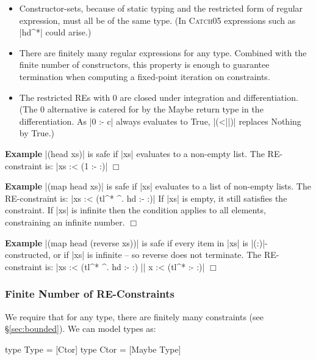 \documentclass[preprint]{sigplanconf}
\newcommand{\C}[1]{\textsf{#1}}
\newcommand{\catch}{\textsc{Catch}}
\newcounter{exmp}
\newcommand{\yesexample}{\addtocounter{exmp}{1}\addvspace{2mm}\noindent\textbf{Example \arabic{exmp}}}
\newcommand{\noexample}{\hfill$\Box$\par\addvspace{2mm}}
\newenvironment{discuss}
    {\noindent\hspace{-1.5mm}\vline\hspace{1mm}\vline\hspace{1mm}\begin{minipage}[h]{\linewidth}}
    {\end{minipage}}
\newenvironment{example}{\yesexample}{\noexample}
\begin{document}
\begin{itemize}
\item \begin{discuss} Constructor-sets, because of static typing and the restricted form of regular expression, must all be of the same type. (In \catch05 expressions such as |hd^*| could arise.)\end{discuss}

\item There are finitely many regular expressions for any type. Combined with the finite number of constructors, this property is enough to guarantee termination when computing a fixed-point iteration on constraints.

\item The restricted REs with 0 are closed under integration and differentiation. (The 0 alternative is catered for by the \C{Maybe} return type in the differentiation. As |0 :- c| always evaluates to True, |(<||)| replaces \C{Nothing} by True.)
\end{itemize}

\begin{example}
|(head xs)| is safe if |xs| evaluates to a non-empty list. The RE-constraint is: |xs :< (1 :- {:})|
\end{example}

\begin{example}
|(map head xs)| is safe if |xs| evaluates to a list of non-empty lists. The RE-constraint is: |xs :< (tl^* ^. hd :- {:})| If |xs| is empty, it still satisfies the constraint. If |xs| is infinite then the condition applies to all elements, constraining an infinite number.
\end{example}

\begin{example}
|(map head (reverse xs))| is safe if every item in |xs| is |(:)|-constructed, or if |xs| is infinite -- so \C{reverse} does not terminate. The RE-constraint is: |xs :< (tl^* ^. hd :- {:}) || x :< (tl^* :- {:})|
\end{example}

\subsubsection{Finite Number of RE-Constraints}
\label{sec:finite_re}

We require that for any type, there are finitely many constraints (see \S\ref{sec:bounded}). We can model types as:

\begin{code}
type Type  = [Ctor]
type Ctor  = [Maybe Type]
\end{code}
\end{document}
